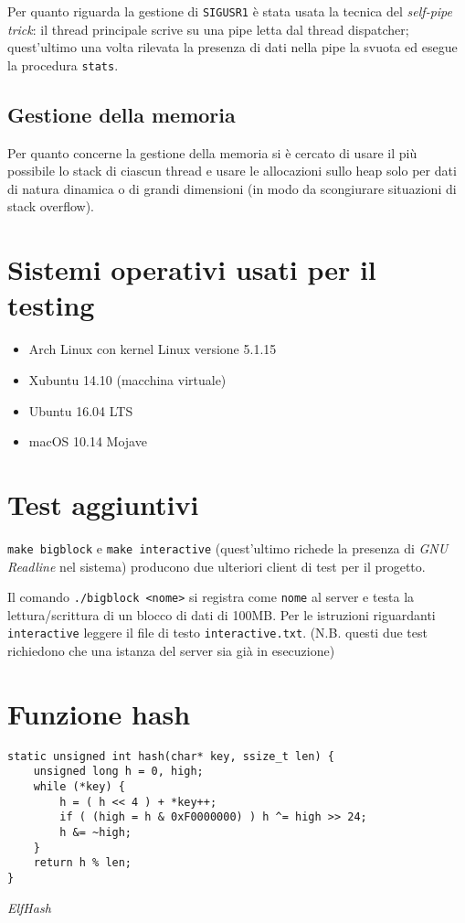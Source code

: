 \documentclass[a4paper,11pt]{article}
\begin{document}
Per quanto riguarda la gestione di \texttt{SIGUSR1} è stata usata la tecnica del \emph{self-pipe trick}: il thread principale scrive su una pipe letta dal thread dispatcher; quest'ultimo
una volta rilevata la presenza di dati nella pipe la svuota ed esegue la procedura \texttt{stats}.

\subsection{Gestione della memoria}
Per quanto concerne la gestione della memoria si è cercato di usare il più possibile lo stack di ciascun thread e usare le allocazioni sullo heap solo per dati
di natura dinamica o di grandi dimensioni (in modo da scongiurare situazioni di stack overflow).
\newpage
\begin{appendices}
\section{Sistemi operativi usati per il testing}
\begin{itemize}
    \item Arch Linux con kernel Linux versione 5.1.15
    \item Xubuntu 14.10 (macchina virtuale)
    \item Ubuntu 16.04 LTS
    \item macOS 10.14 Mojave
\end{itemize}

\section{Test aggiuntivi}
\texttt{make bigblock} e \texttt{make interactive} (quest'ultimo richede la presenza di \emph{GNU Readline} nel sistema)
producono due ulteriori client di test per il progetto.

Il comando \texttt{./bigblock <nome>} si registra come \texttt{nome} al server e testa la lettura/scrittura di un blocco di dati di 100MB.
Per le istruzioni riguardanti \texttt{interactive} leggere il file di testo \texttt{interactive.txt}. 
(N.B. questi due test richiedono che una istanza del server sia già in esecuzione)
\section{Funzione hash}
\begin{listing}[ht]
    \begin{verbatim}
static unsigned int hash(char* key, ssize_t len) {
    unsigned long h = 0, high;
    while (*key) {
        h = ( h << 4 ) + *key++;
        if ( (high = h & 0xF0000000) ) h ^= high >> 24;
        h &= ~high;
    }
    return h % len;
}
    \end{verbatim}
    \caption{\emph{ElfHash}}
\end{listing}
\end{appendices}    
\end{document}
